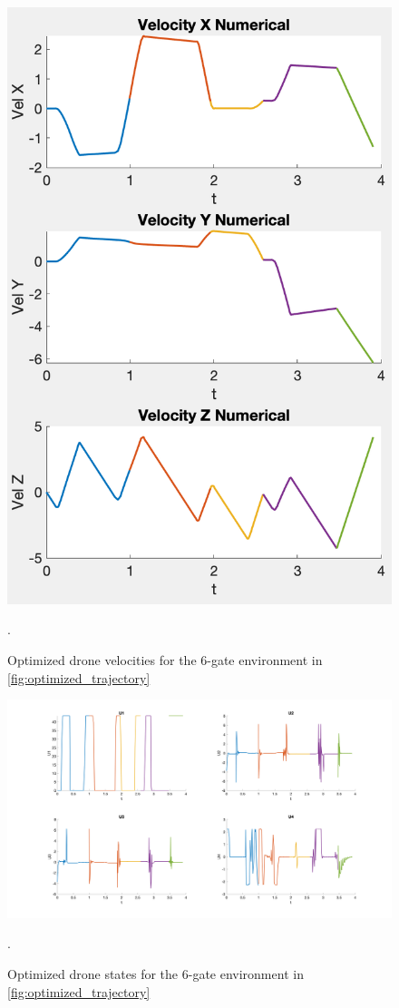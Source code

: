 \begin{figure}[htbp]
  \centering
  \includegraphics[width=1.0\columnwidth]{img/velocities.png}
  \caption{Optimized drone velocities for the 6-gate environment in \cref{fig:optimized_trajectory}}.
  \label{fig:optimized_velocities}
\end{figure}

\begin{figure}[htbp]
  \centering
  \includegraphics[width=1.0\textwidth]{img/controls.png}
  \caption{Optimized drone states for the 6-gate environment in \cref{fig:optimized_trajectory}}.
  \label{fig:optimized_controls}
\end{figure}

